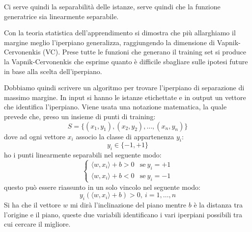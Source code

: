 Ci serve quindi la separabilità delle istanze, serve quindi che la funzione generatrice
sia linearmente separabile.
\begin{teorema}
    Con la teoria statistica dell'apprendimento si dimostra che più allarghiamo
    il margine meglio l'iperpiano generalizza, raggiungendo la dimensione di
    Vapnik-Cervonenkis (VC). Prese tutte le funzioni che generano il training
    set si produce la Vapnik-Cervonenkis che esprime quanto è difficile sbagliare
    sulle ipotesi future in base alla scelta dell'iperpiano.
\end{teorema}
Dobbiamo quindi scrivere un algoritmo per trovare l'iperpiano di separazione di
massimo margine. In input si hanno le istanze etichettate e in output un vettore
che identifica l'iperpiano. Viene usata una notazione matematica, la quale prevede
che, preso un insieme di punti di training:
\begin{equation}
    S = \{(x_1, y_1), (x_2, y_2),\dots, (x_n, y_n)\}
\end{equation}
dove ad ogni vettore $x_i$ associo la classe di appartenenza $y_i$:
\begin{equation}
    y_i \in \{-1, +1\}
\end{equation}
ho i punti linearmente separabili nel seguente modo:
\begin{equation}
    \begin{cases}
        \langle w, x_i \rangle + b > 0 & \text{se} \ y_i = +1 \\
        \langle w, x_i \rangle + b < 0 & \text{se} \ y_i = -1
    \end{cases}
\end{equation}
questo può essere riassunto in un solo vincolo nel seguente modo:
\begin{equation}
    y_i(\langle w, x_i\rangle + b) > 0, \  i = 1,\dots, n
\end{equation}
Si ha che il vettore $w$ mi dirà l'inclinazione del piano mentre $b$ è la distanza
tra l'origine e il piano, queste due variabili identificano i vari iperpiani
possibili tra cui cercare il migliore.

